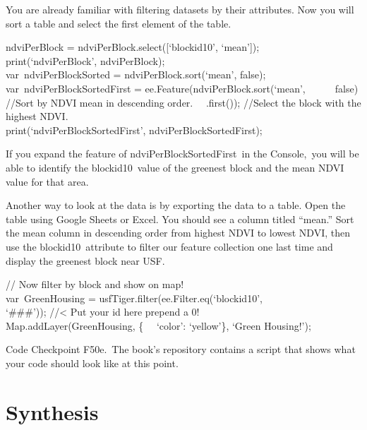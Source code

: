 \documentclass[
  letterpaper,
  DIV=11,
  numbers=noendperiod]{scrreprt}
\begin{document}
You are already familiar with filtering datasets by their attributes.
Now you will sort a table and select the first element of the table.

ndviPerBlock = ndviPerBlock.select({[}`blockid10', `mean'{]});\\
print(`ndviPerBlock', ndviPerBlock);\\
var~ndviPerBlockSorted = ndviPerBlock.sort(`mean', false);\\
var~ndviPerBlockSortedFirst = ee.Feature(ndviPerBlock.sort(`mean',~ ~ ~
~false) //Sort by NDVI mean in descending order.~ ~.first()); //Select
the block with the highest NDVI.\\
print(`ndviPerBlockSortedFirst', ndviPerBlockSortedFirst);

If you expand the feature of ndviPerBlockSortedFirst~in the Console,~you
will be able to identify the blockid10~value of the greenest block and
the mean NDVI value for that area.

Another way to look at the data is by exporting the data to a table.
Open the table using Google Sheets or Excel. You should see a column
titled ``mean.'' Sort the mean column in descending order from highest
NDVI to lowest NDVI, then use the blockid10~attribute to filter our
feature collection one last time and display the greenest block near
USF.

// Now filter by block and show on map!\\
var~GreenHousing = usfTiger.filter(ee.Filter.eq(`blockid10',\\
`\#\#\#')); //\textless{} Put your id here prepend a 0!\\
Map.addLayer(GreenHousing, \{~ ~`color': `yellow'\}, `Green Housing!');

\begin{tcolorbox}[enhanced jigsaw, left=2mm, breakable, rightrule=.15mm, opacityback=0, colframe=quarto-callout-note-color-frame, colbacktitle=quarto-callout-note-color!10!white, arc=.35mm, opacitybacktitle=0.6, toptitle=1mm, colback=white, leftrule=.75mm, title=\textcolor{quarto-callout-note-color}{\faInfo}\hspace{0.5em}{Note}, toprule=.15mm, bottomtitle=1mm, titlerule=0mm, bottomrule=.15mm, coltitle=black]

Code Checkpoint F50e.~The book's repository contains a script that shows
what your code should look like at this point.~

\end{tcolorbox}

\hypertarget{synthesis-13}{%
\section*{Synthesis}\label{synthesis-13}}
\end{document}
